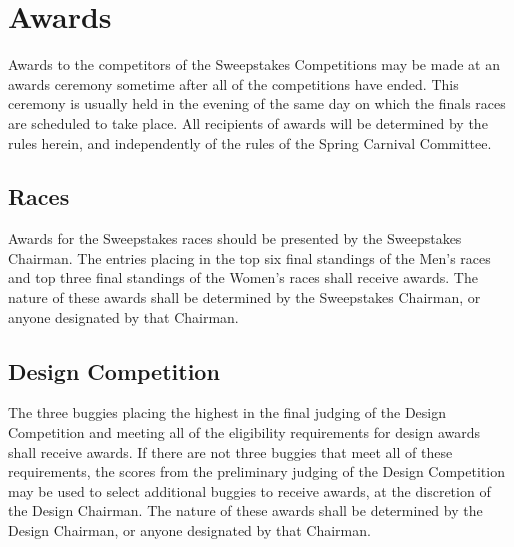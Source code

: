 \chapter{Awards}

	Awards to the competitors of the Sweepstakes Competitions may be made at an
	awards ceremony sometime after all of the competitions have ended. This 
	ceremony is usually held in the evening of the same day on which the finals
	races are scheduled to take place. All recipients of awards will be 
	determined by the rules herein, and independently of the rules of the Spring
	Carnival Committee.

\section{Races}

	Awards for the Sweepstakes races should be presented by the Sweepstakes
	Chairman. The entries placing in the top six final standings of the 
	Men's races and top three final standings of the Women's races shall 
	receive awards. The nature of these awards shall be determined by the 
	Sweepstakes Chairman, or anyone designated by that Chairman.

\section{Design Competition}

	The three buggies placing the highest in the final judging of the Design 
	Competition and meeting all of the eligibility requirements for design 
	awards shall receive awards. If there are not three buggies that meet all 
	of these requirements, the scores from the preliminary judging of the Design
	Competition may be used to select additional buggies to receive awards, at 
	the discretion of the Design Chairman. The nature of these awards shall be 
	determined by the Design Chairman, or anyone designated by that Chairman.

